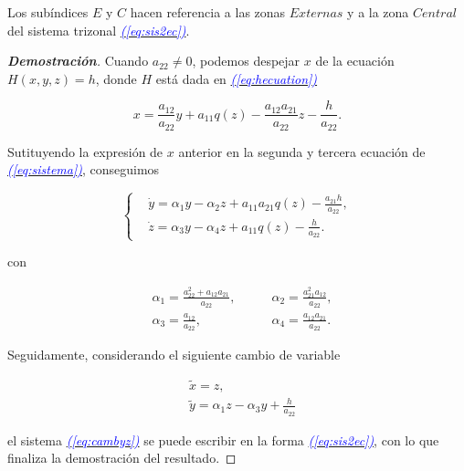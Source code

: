 \documentclass[12pt,a4paper]{report} %
\newcommand{\eref}[1]{\hyperref[#1]{\textcolor{blue}{\textit{(\ref*{#1})}}}}
\begin{document}
 \vspace{0.5cm} Los subíndices $E$ y $C$ hacen referencia a las zonas $Externas$ y a la zona $Central$ del sistema trizonal \eref{eq:sis2ec}.
	
	\vspace{0.5cm}
		
	\begin{proof}[\textbf{Demostración}]
		 Cuando $a_{22}\neq0$, podemos despejar $x$ de la ecuación $H(x,y,z)=h$, donde $H$ está dada en \eref{eq:hecuation}
		
		\begin{equation}
			\label{eq:xeqn}
			x=\frac{a_{12}}{a_{22}}y+a_{11}q(z)-\frac{a_{12}a_{21}}{a_{22}}z-\frac{h}{a_{22}}.
		\end{equation}\smallskip
		
		\noindent Sutituyendo la expresión de $x$ anterior en la segunda y tercera ecuación de \eref{eq:sistema}, conseguimos
		
		\begin{equation}
			\label{eq:cambyz}
			\left\{
			\begin{aligned}
				&\dot{y}=\alpha_1y-\alpha_2z+a_{11}a_{21}q(z)-\frac{a_{21}h}{a_{22}}, \\[2mm]
				&\dot{z}=\alpha_3y-\alpha_4z+a_{11}q(z)-\frac{h}{a_{22}}.
			\end{aligned}
			\right.
		\end{equation}
		
	    \noindent con
		
		\begin{equation}
			\label{eq:alphamatriz}
			\begin{aligned}
				&\alpha_1=\frac{a_{22}^2+a_{12}a_{21}}{a_{22}}, \qquad &\alpha_2=\frac{a_{21}^2a_{12}}{a_{22}},\\[2mm]
				&\alpha_3=\frac{a_{12}}{a_{22}}, \qquad &\alpha_4=\frac{a_{12}a_{21}}{a_{22}}.
			\end{aligned}
		\end{equation}\smallskip
		
		\noindent Seguidamente, considerando el siguiente cambio de variable
		
		\begin{equation}
			\label{eq:xytilde}
			\begin{aligned}
				&\tilde{x}=z, \\[2mm]
				&\tilde{y}=\alpha_1z-\alpha_3y+\frac{h}{a_{22}}
			\end{aligned}
		\end{equation}\smallskip
		
		 \noindent el sistema \eref{eq:cambyz} se puede escribir en la forma \eref{eq:sis2ec}, con lo que finaliza la demostración del resultado.
		
	\end{proof}
	
\end{document}
